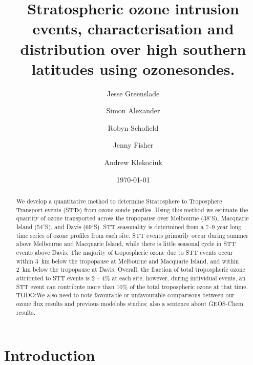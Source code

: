 \documentclass{article}
\begin{document}
\title{Stratospheric ozone intrusion events, characterisation and distribution over high southern latitudes using ozonesondes.}

\author[1]{Jesse Greenslade}
\author[2]{Simon Alexander}
\author[3,4]{Robyn Schofield}
\author[1,5]{Jenny Fisher}
\author[2]{Andrew Klekociuk}


\date{\today}



\maketitle

\begin{abstract}
  We develop a quantitative method to determine Stratosphere to Troposphere Transport events (STTs) from ozone sonde profiles. 
  Using this method we estimate the quantity of ozone transported across the tropopause over Melbourne ($38^\circ$S), Macquarie Island ($54^\circ$S), and Davis ($69^\circ$S).
  STT seasonality is determined from a 7--9 year long time series of ozone profiles from each site.
  STT events primarily occur during summer above Melbourne and Macquarie Island, while there is little seasonal cycle in STT events above Davis.
  The majority of tropospheric ozone due to STT events occur within 3~km below the tropopause at Melbourne and Macquarie Island, and within 2~km below the tropopause at Davis.
  Overall, the fraction of total tropospheric ozone attributed to STT events is 2 – 4\% at each site, however, during individual events, an STT event can contribute more than 10\% of the total tropospheric ozone at that time.
  TODO:We also need to note favourable or unfavourable comparisons between our ozone flux results and previous model\/obs studies; also a sentence about GEOS-Chem results.
\end{abstract}%


\section{Introduction}
\end{document}
